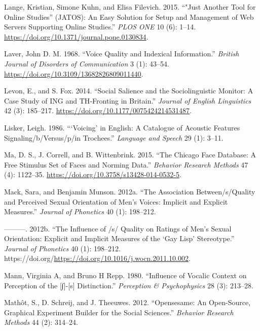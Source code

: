 \documentclass[
  letterpaper,
  DIV=11,
  numbers=noendperiod]{scrartcl}
\newlength{\cslhangindent}
\newenvironment{CSLReferences}[2] %
 {\begin{list}{}{%
  \setlength{\itemindent}{0pt}
  \setlength{\leftmargin}{0pt}
  \setlength{\parsep}{0pt}
  \ifodd #1
   \setlength{\leftmargin}{\cslhangindent}
   \setlength{\itemindent}{-1\cslhangindent}
  \fi
  \setlength{\itemsep}{#2\baselineskip}}}
 {\end{list}}
\begin{document}
\begin{CSLReferences}{1}{0}
Lange, Kristian, Simone Kuhn, and Elisa Filevich. 2015. {``"Just Another
Tool for Online Studies'' (JATOS): An Easy Solution for Setup and
Management of Web Servers Supporting Online Studies.''} \emph{PLOS ONE}
10 (6): 1--14. \url{https://doi.org/10.1371/journal.pone.0130834}.

Laver, John D. M. 1968. {``Voice Quality and Indexical Information.''}
\emph{British Journal of Disorders of Communication} 3 (1): 43--54.
\url{https://doi.org/10.3109/13682826809011440}.

Levon, E., and S. Fox. 2014. {``Social Salience and the Sociolinguistic
Monitor: {A} Case Study of {ING} and {TH}-Fronting in Britain.''}
\emph{Journal of English Linguistics} 42 (3): 185--217.
\url{https://doi.org/10.1177/0075424214531487}.

Lisker, Leigh. 1986. {``{`Voicing'} in English: A Catalogue of Acoustic
Features Signaling/b/Versus/p/in Trochees.''} \emph{Language and Speech}
29 (1): 3--11.

Ma, D. S., J. Correll, and B. Wittenbrink. 2015. {``The Chicago Face
Database: A Free Stimulus Set of Faces and Norming Data.''}
\emph{Behavior Research Methods} 47 (4): 1122--35.
\url{https://doi.org/10.3758/s13428-014-0532-5}.

Mack, Sara, and Benjamin Munson. 2012a. {``The Association
Between/s/Quality and Perceived Sexual Orientation of Men's Voices:
Implicit and Explicit Measures.''} \emph{Journal of Phonetics} 40 (1):
198--212.

---------. 2012b. {``The Influence of /s/ Quality on Ratings of Men's
Sexual Orientation: Explicit and Implicit Measures of the {`Gay Lisp'}
Stereotype.''} \emph{Journal of Phonetics} 40 (1): 198--212.
https://doi.org/\url{https://doi.org/10.1016/j.wocn.2011.10.002}.

Mann, Virginia A, and Bruno H Repp. 1980. {``Influence of Vocalic
Context on Perception of the {[}∫{]}-{[}s{]} Distinction.''}
\emph{Perception \& Psychophysics} 28 (3): 213--28.

Mathôt, S., D. Schreij, and J. Theeuwes. 2012. {``Opensesame: An
Open-Source, Graphical Experiment Builder for the Social Sciences.''}
\emph{Behavior Research Methods} 44 (2): 314--24.


\end{CSLReferences}
\end{document}
